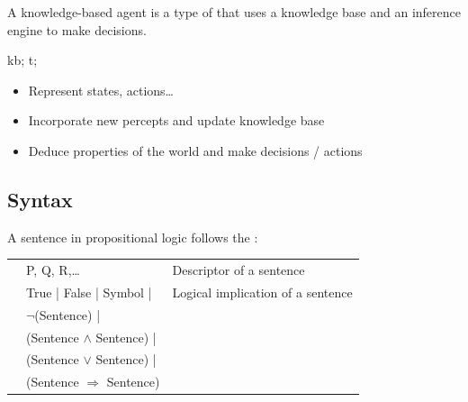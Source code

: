 \documentclass[
../../EiKI_Summary.tex,
]
{subfiles}
\begin{document}
\begin{defbox}
    A knowledge-based agent is a type of  that uses a knowledge base and an inference engine to make decisions. 

    \begin{codebox*}
        \begin{algorithm}[H]

            kb; 
            t; 
        \end{algorithm}
    \end{codebox*}

    \begin{itemize}
        \item Represent states, actions\dots
        \item Incorporate new percepts and update knowledge base
        \item Deduce properties of the world and make decisions / actions
    \end{itemize}
\end{defbox}

\newpage
\subsection{Syntax}
A sentence in propositional logic follows the :

\begin{tabular}{r l l}
    {Symbol:}   & P, Q, R,\dots & Descriptor of a sentence\\
    {Sentence:} & True | False | Symbol | & Logical implication of a sentence\\
    & $\neg$(Sentence) | &\\
    & (Sentence $\land$ Sentence) | &\\
    & (Sentence $\lor$ Sentence) | &\\
    & (Sentence $\Rightarrow$ Sentence) &\\
\end{tabular}
\end{document}
